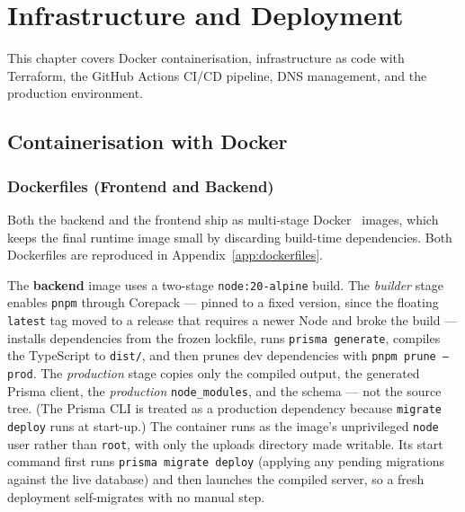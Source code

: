 \documentclass[12pt, a4paper, oneside]{report}
\newenvironment{chapterintro}{%
  \begin{mdframed}[backgroundcolor=cheebolightgray,linecolor=cheeboblue,linewidth=1pt]
  \small\itshape
}{%
  \end{mdframed}
}
\begin{document}
\chapter{Infrastructure and Deployment}

\begin{chapterintro}
  This chapter covers Docker containerisation, infrastructure as code with
  Terraform, the GitHub Actions CI/CD pipeline, DNS management, and the
  production environment.
\end{chapterintro}

\section{Containerisation with Docker}

\subsection{Dockerfiles (Frontend and Backend)}

Both the backend and the frontend ship as multi-stage
Docker~\cite{docker} images,
which keeps the final runtime image small by discarding build-time
dependencies. Both Dockerfiles are reproduced in
Appendix~\ref{app:dockerfiles}.

The \textbf{backend} image uses a two-stage
\texttt{node:20-alpine} build. The \emph{builder}
stage enables \texttt{pnpm} through Corepack --- pinned to a fixed
version, since the floating \texttt{latest} tag moved to a release that
requires a newer Node and broke the build --- installs dependencies
from the frozen lockfile, runs \texttt{prisma generate}, compiles
the TypeScript to \texttt{dist/}, and then prunes dev dependencies
with \texttt{pnpm prune --prod}. The \emph{production} stage copies
only the compiled output, the generated Prisma client, the
\emph{production} \texttt{node\_modules}, and the schema --- not the
source tree. (The Prisma CLI is treated as a production dependency
because \texttt{migrate deploy} runs at start-up.) The container runs
as the image's unprivileged \texttt{node} user rather than
\texttt{root}, with only the uploads directory made writable. Its
start command first runs \texttt{prisma migrate deploy}
(applying any pending migrations against the live database) and then
launches the compiled server, so a fresh deployment self-migrates with
no manual step.
\end{document}

